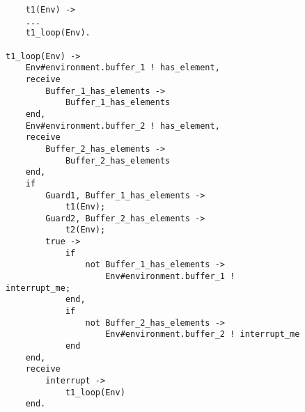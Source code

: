 \begin{figure}[h!]
\begin{verbatim}
    t1(Env) -> 
    ...
    t1_loop(Env).

t1_loop(Env) -> 
    Env#environment.buffer_1 ! has_element,
    receive 
        Buffer_1_has_elements -> 
            Buffer_1_has_elements
    end,
    Env#environment.buffer_2 ! has_element,
    receive 
        Buffer_2_has_elements -> 
            Buffer_2_has_elements
    end,
    if
        Guard1, Buffer_1_has_elements ->
            t1(Env); 
        Guard2, Buffer_2_has_elements ->
            t2(Env);
        true ->
            if
                not Buffer_1_has_elements ->
                    Env#environment.buffer_1 ! interrupt_me;
            end,       
            if       
                not Buffer_2_has_elements ->
                    Env#environment.buffer_2 ! interrupt_me
            end
    end,
    receive 
        interrupt -> 
            t1_loop(Env)
    end.
\end{verbatim}
\end{figure}
